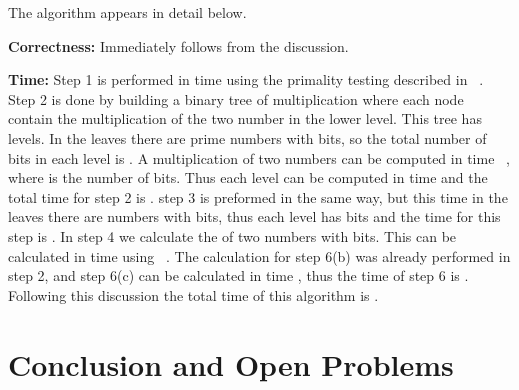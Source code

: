 \documentclass[11pt,amssymb]{article}
\begin{document}
The algorithm appears in detail below.


{\bf Correctness:} Immediately follows from the discussion.

{\bf Time:} Step 1 is performed in time 
using the primality testing described in ~\cite{berri:02}. Step 2 is
done by building a binary tree of multiplication where each node
contain the multiplication of the two number in the lower level. This
tree has  levels. In the leaves there are  prime
numbers with  bits, so the total number of bits in each
level is . A multiplication of two numbers can be
computed in time  ~\cite{SS-71}, where  is
the number of bits. Thus each level can be computed in time  and the total time for step 2 is . step 3 is preformed in the same way, but this time
in the leaves there are  numbers with  bits, thus each
level has  bits and the time for this step is . In step 4 we calculate the  of two numbers with  bits. This can be calculated in time  using ~\cite{SZ:02}. The calculation for step 6(b) was
already performed in step 2, and step 6(c) can be calculated in time
, thus the time of step 6 is . Following this discussion the total time of this
algorithm is .


\section{Conclusion and Open Problems}\label{s:conc}
\end{document}
